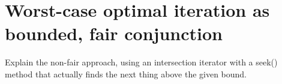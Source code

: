 \documentclass[acmsmall,screen,review,anonymous,dvipsnames]{acmart}
\newcommand\todo[1]{{\color{Orange}#1}}
\begin{document}











\section{Worst-case optimal iteration as bounded, fair conjunction}

\todo{Explain the non-fair approach, using an intersection iterator with a seek() method that actually finds the next thing above the given bound.}
\end{document}
